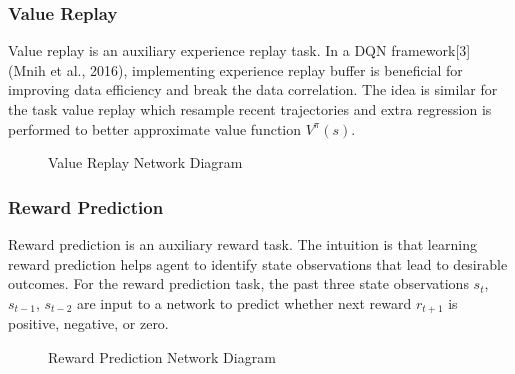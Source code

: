 \documentclass[12pt,twocolumn,letterpaper]{article}
\begin{document}
\subsubsection{Value Replay}
Value replay is an auxiliary experience replay task. In a DQN framework[3] (Mnih et al., 2016), implementing experience replay buffer is beneficial for improving data efficiency and break the data correlation. The idea is similar for the task value replay which resample recent trajectories and extra regression is performed to better approximate value function $V^\pi(s)$.
\begin{figure}[H]
\begin{center}
\end{center}
   \caption{Value Replay Network Diagram}
\label{fig:long}
\label{fig:onecol}
\end{figure}

\subsubsection{Reward Prediction}
Reward prediction is an auxiliary reward task. The intuition is that learning reward prediction helps agent to identify state observations that lead to desirable outcomes. For the reward prediction task, the past three state observations $s_t$, $s_{t-1}$, $s_{t-2}$ are input to a network to predict whether next reward $r_{t+1}$ is positive, negative, or zero. 
\begin{figure}[H]
\begin{center}
\end{center}
   \caption{Reward Prediction Network Diagram}
\label{fig:long}
\label{fig:onecol}
\end{figure}
\end{document}

